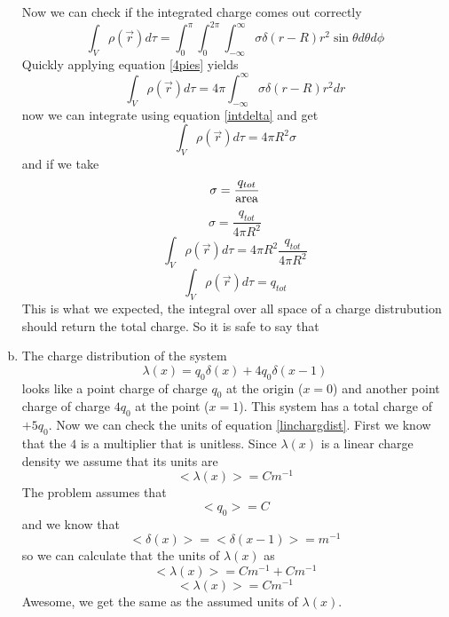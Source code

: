 \documentclass[11pt]{article}
\numberwithin{equation}{section}
\begin{document}
\begin{enumerate}[(a)]
Now we can check if the integrated charge comes out correctly
$$\int_V \rho(\vec{r}) d\tau = \int_{0}^{\pi}\int_{0}^{2\pi}\int_{-\infty}^{\infty} \sigma\delta(r-R)r^2\sin{\theta}d\theta d\phi$$
Quickly applying equation \ref{4pies} yields 
$$\int_V \rho(\vec{r}) d\tau = 4\pi\int_{-\infty}^{\infty} \sigma\delta(r-R)r^2dr$$
now we can integrate using equation \ref{intdelta} and get
$$\int_V \rho(\vec{r}) d\tau = 4\pi R^2 \sigma$$
and if we take 
$$\sigma = \frac{q_{tot}}{\textnormal{area}}$$
$$\sigma = \frac{q_{tot}}{4\pi R^2}$$
$$\int_V \rho(\vec{r}) d\tau = 4\pi R^2 \frac{q_{tot}}{4\pi R^2}$$
$$\int_V \rho(\vec{r}) d\tau = q_{tot}$$
This is what we expected, the integral over all space of a charge distrubution should return the total charge. So it is safe to say that
\begin{center}
\end{center}
\item
The charge distribution of the system 
\begin{equation}
\lambda(x) = q_0\delta(x) + 4q_0\delta(x-1)
\label{linchargdist}
\end{equation}
looks like a point charge of charge $q_0$ at the origin ($x=0$) and another point charge of charge $4q_0$ at the point ($x=1$). This system has a total charge of $+5q_0$. Now we can check the units of equation \ref{linchargdist}. First we know that the $4$ is a multiplier that is unitless. Since $\lambda(x)$ is a linear charge density we assume that its units are 
$$<\lambda(x)> = C m^{-1}$$ 
The problem assumes that
$$<q_0> = C$$
and we know that 
$$<\delta(x)> = <\delta(x - 1)> = m^{-1}$$
so we can calculate that the units of $\lambda(x)$ as
$$<\lambda(x)> = Cm^{-1} + Cm^{-1}$$
$$<\lambda(x)> = Cm^{-1}$$
Awesome, we get the same as the assumed units of $\lambda(x)$.


\end{enumerate}
\end{document}
